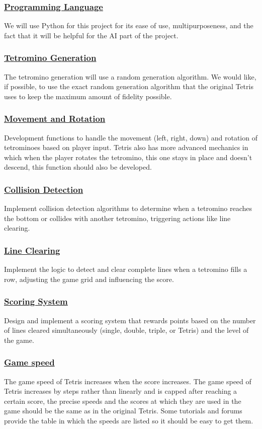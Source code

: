 \documentclass[conference]{IEEEtran}
\begin{document}
\subsubsection{\underline{Programming Language}}
We will use Python for this project for its ease of use, multipurposeness, and the fact that it will be helpful for the AI part of the project.
\subsubsection{\underline{Tetromino Generation}}
The tetromino generation will use a random generation algorithm. We would like, if possible, to use the exact random generation algorithm that the original Tetris uses to keep the maximum amount of fidelity possible.
\subsubsection{\underline{Movement and Rotation}}
Development functions to handle the movement (left, right, down) and rotation of tetrominoes based on player input. Tetris also has more advanced mechanics in which when the player rotates the tetromino, this one stays in place and doesn’t descend, this function should also be developed.
\subsubsection{\underline{Collision Detection}}
Implement collision detection algorithms to determine when a tetromino reaches the bottom or collides with another tetromino, triggering actions like line clearing.
\subsubsection{\underline{Line Clearing}}
Implement the logic to detect and clear complete lines when a tetromino fills a row, adjusting the game grid and influencing the score.
\subsubsection{\underline{Scoring System}}
Design and implement a scoring system that rewards points based on the number of lines cleared simultaneously (single, double, triple, or Tetris) and the level of the game.
\subsubsection{\underline{Game speed}}
The game speed of Tetris increases when the score increases. The game speed of Tetris increases by steps rather than linearly and is capped after reaching a certain score, the precise speeds and the scores at which they are used in the game should be the same as in the original Tetris. Some tutorials and forums provide the table in which the speeds are listed so it should be easy to get them.
\end{document}
